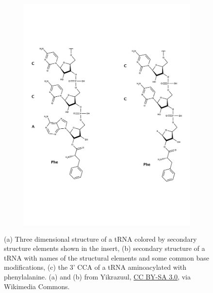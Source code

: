 \begin{figure}
\begin{subfigure}[b]{0.3\textwidth}
         \caption{}
         \label{fig:tRNA_2d_struct}
     \end{subfigure}
     \hfill
     \begin{subfigure}[b]{0.2\textwidth}
         \centering
         \includegraphics[width=\textwidth]{figures/chap4/CCA_Phe.pdf}
         \caption{}
         \label{fig:tRNA_CCAester}
     \end{subfigure}
        \caption[tRNA structural overview]{
        (a) Three dimensional structure of a tRNA colored by secondary structure elements shown in the insert, (b) secondary structure of a tRNA with names of the structural elements and some common base modifications, (c) the 3' CCA of a tRNA aminoacylated with phenylalanine.
        (a) and (b) from Yikrazuul, \href{https://creativecommons.org/licenses/by-sa/3.0}{CC BY-SA 3.0}, via Wikimedia Commons.
        }
\end{figure}





